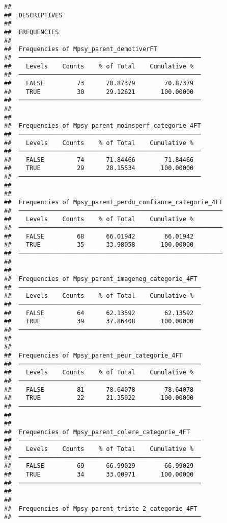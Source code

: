 \documentclass[
]{article}
\begin{document}
\begin{verbatim}
## 
##  DESCRIPTIVES
## 
##  FREQUENCIES
## 
##  Frequencies of Mpsy_parent_demotiverFT             
##  ────────────────────────────────────────────────── 
##    Levels    Counts    % of Total    Cumulative %   
##  ────────────────────────────────────────────────── 
##    FALSE         73      70.87379        70.87379   
##    TRUE          30      29.12621       100.00000   
##  ────────────────────────────────────────────────── 
## 
## 
##  Frequencies of Mpsy_parent_moinsperf_categorie_4FT 
##  ────────────────────────────────────────────────── 
##    Levels    Counts    % of Total    Cumulative %   
##  ────────────────────────────────────────────────── 
##    FALSE         74      71.84466        71.84466   
##    TRUE          29      28.15534       100.00000   
##  ────────────────────────────────────────────────── 
## 
## 
##  Frequencies of Mpsy_parent_perdu_confiance_categorie_4FT 
##  ──────────────────────────────────────────────────────── 
##    Levels    Counts    % of Total    Cumulative %   
##  ──────────────────────────────────────────────────────── 
##    FALSE         68      66.01942        66.01942   
##    TRUE          35      33.98058       100.00000   
##  ──────────────────────────────────────────────────────── 
## 
## 
##  Frequencies of Mpsy_parent_imageneg_categorie_4FT  
##  ────────────────────────────────────────────────── 
##    Levels    Counts    % of Total    Cumulative %   
##  ────────────────────────────────────────────────── 
##    FALSE         64      62.13592        62.13592   
##    TRUE          39      37.86408       100.00000   
##  ────────────────────────────────────────────────── 
## 
## 
##  Frequencies of Mpsy_parent_peur_categorie_4FT      
##  ────────────────────────────────────────────────── 
##    Levels    Counts    % of Total    Cumulative %   
##  ────────────────────────────────────────────────── 
##    FALSE         81      78.64078        78.64078   
##    TRUE          22      21.35922       100.00000   
##  ────────────────────────────────────────────────── 
## 
## 
##  Frequencies of Mpsy_parent_colere_categorie_4FT    
##  ────────────────────────────────────────────────── 
##    Levels    Counts    % of Total    Cumulative %   
##  ────────────────────────────────────────────────── 
##    FALSE         69      66.99029        66.99029   
##    TRUE          34      33.00971       100.00000   
##  ────────────────────────────────────────────────── 
## 
## 
##  Frequencies of Mpsy_parent_triste_2_categorie_4FT  
##  ────────────────────────────────────────────────── 

\end{verbatim}
\end{document}
